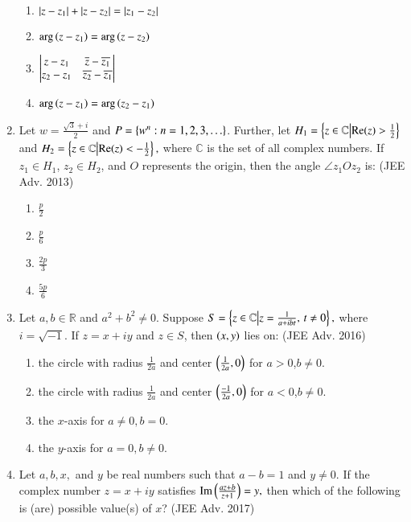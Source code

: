 \documentclass[journal,12pt, onecolumn]{IEEEtran}
\theoremstyle{remark}
\begin{document}
\begin{enumerate}
\begin{enumerate}
    \item $\left\vert z-z_1\right\vert+\left\vert z-z_2\right\vert=\left\vert z_1-z_2\right\vert$
    \item $\mathrm{arg}\left(z-z_1\right)=\mathrm{arg}\left(z-z_2\right)$
    \item $\begin{vmatrix}z-z_1 & \overline{z}-\overline{z_1} \\z_2-z_1 & \overline{z_2}-\overline{z_1}\end{vmatrix}$
    \item $\mathrm{arg}\left(z-z_1\right)=\mathrm{arg}\left(z_2-z_1\right)$
\end{enumerate}
\item Let $w=\frac{\sqrt{3}+i}{2}$ and $P=\left\{w^n:n=1,2,3,\ldots\right\}$. Further, let $H_1=\left\{z \in \mathbb{C} \middle|\text{Re}(z) > \frac{1}{2}\right\}$ and $H_2=\left\{ z \in \mathbb{C}\middle|\text{Re}(z) < -\frac{1}{2}\right\},$
where $\mathbb{C}$ is the set of all complex numbers. If $z_1 \in H_1$, $z_2 \in H_2$, and $O$ represents the origin, then the angle $\angle z_1Oz_2$ is: \hfill (JEE Adv. 2013)
\begin{multicols}{4}
    \begin{enumerate}
    \item $\frac{p}{2}$
    \item $\frac{p}{6}$
    \item $\frac{2p}{3}$
    \item $\frac{5p}{6}$
    \end{enumerate}
\end{multicols}
\item Let $a,b \in \mathbb{R}$ and $a^2+b^2 \ne 0$. Suppose $S=\left\{ z \in \mathbb{C}\middle|z = \frac{1}{a + ibt}, \, t \ne 0\right\},$
    where $i=\sqrt{-1}$. If $z=x+iy$ and $z \in S$, then $\left(x,y\right)$ lies on: \hfill (JEE Adv. 2016)
    \begin{enumerate}
    \item the circle with radius $\frac{1}{2a}$ and center $\left(\frac{1}{2a},0\right)$ for $a>0$,$b \ne 0$.
    \item the circle with radius $\frac{1}{2a}$ and center $\left(\frac{-1}{2a}, 0\right)$ for $a<0$,$b \ne 0$.
    \item the $x$-axis for $a \ne 0 ,b=0$.
    \item the $y$-axis for $a=0, b \ne 0$.
    \end{enumerate}
\item Let $a,b,x,$ and $y$ be real numbers such that $a-b=1$ and $y \ne 0$. If the complex number $z=x+iy$ satisfies $\mathrm{Im}\left(\frac{az+b}{z+1}\right)=y,$ then which of the following is (are) possible value(s) of $x$? \hfill (JEE Adv. 2017)

\end{enumerate}
\end{document}
